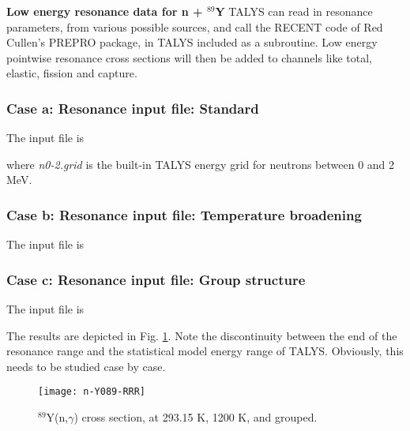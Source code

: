 \begin{samplecase}
{\bf Low energy resonance data for n + ${}^{89}$Y}\newline
TALYS can read in resonance parameters, from various 
possible sources, and call the RECENT code of Red Cullen's PREPRO package, in TALYS included as a subroutine. 
Low energy pointwise resonance cross sections will then be added to channels 
like total, elastic, fission and capture.
\subsubsection{Case a: Resonance input file: Standard}
The input file is


where {\it n0-2.grid} is the built-in TALYS energy grid for neutrons between 0 and 2 MeV.
\subsubsection{Case b: Resonance input file: Temperature broadening}
The input file is


\subsubsection{Case c: Resonance input file: Group structure}
The input file is


The results are depicted in Fig. \ref{ngres}. Note the discontinuity between 
the end of the resonance range and the statistical model energy range of TALYS.
Obviously, this needs to be studied case by case.
\end{samplecase}
\begin{figure}
\centering\texttt{[image: n-Y089-RRR]}
\caption{${}^{89}$Y(n,$\gamma$) cross section, at 293.15 K, 1200 K, and grouped.}
\label{ngres}
\end{figure}
